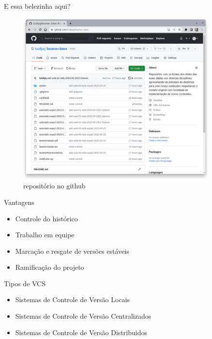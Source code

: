 \documentclass{beamer}
\begin{document}
\begin{frame}[fragile]{E essa belezinha aqui?}
      \begin{figure}[H]
            \centerline{\includegraphics[width=0.9\textwidth]{assets/aula-tdsi-ifds-2023-05-24/Captura de tela de 2023-05-23 11-32-53.png}}
            \caption{repositório no github}
        \end{figure}
\end{frame}

\begin{frame}[fragile]{Vantagens}

      \begin{itemize}
            \item Controle do histórico
            \item Trabalho em equipe
            \item Marcação e resgate de versões estáveis
            \item Ramificação do projeto
      \end{itemize}
      \end{frame}

      




\begin{frame}[fragile]{Tipos de VCS}

      \begin{itemize}
            \item Sistemas de Controle de Versão Locais
            \item Sistemas de Controle de Versão Centralizados
            \item Sistemas de Controle de Versão Distribuidos
      \end{itemize}
      \end{frame}
\end{document}
